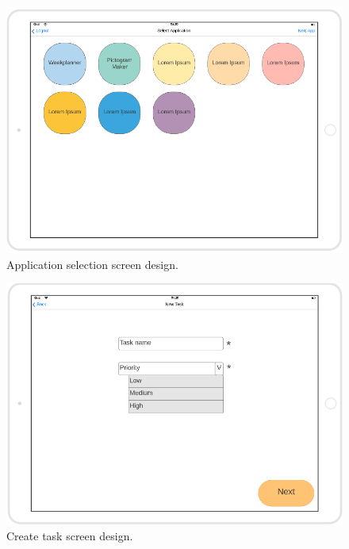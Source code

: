 \begin{figure}[H]
    \includegraphics[width=\textwidth]{Sprint_1/images/app_selection_screen.png}
    \caption{Application selection screen design.}
    \label{app_selection_screen}

\end{figure}

\begin{figure}[H]
    \includegraphics[width=\textwidth]{Sprint_1/images/create_task_screen.png}
    \caption{Create task screen design.}
    \label{create_task_screen}

\end{figure}

